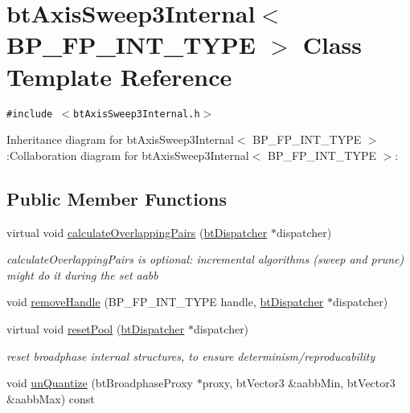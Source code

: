 \hypertarget{classbt_axis_sweep3_internal}{
\section{btAxisSweep3Internal$<$ BP\_\-FP\_\-INT\_\-TYPE $>$ Class Template Reference}
\label{classbt_axis_sweep3_internal}
}
{\tt \#include $<$btAxisSweep3Internal.h$>$}

Inheritance diagram for btAxisSweep3Internal$<$ BP\_\-FP\_\-INT\_\-TYPE $>$:Collaboration diagram for btAxisSweep3Internal$<$ BP\_\-FP\_\-INT\_\-TYPE $>$:\subsection*{Public Member Functions}
\begin{CompactItemize}
\item 
\hypertarget{classbt_axis_sweep3_internal_b89835d4ecb51e2dadc7e3b6e7c29adb}{
virtual void \hyperlink{classbt_axis_sweep3_internal_b89835d4ecb51e2dadc7e3b6e7c29adb}{calculateOverlappingPairs} (\hyperlink{classbt_dispatcher}{btDispatcher} $\ast$dispatcher)}
\label{classbt_axis_sweep3_internal_b89835d4ecb51e2dadc7e3b6e7c29adb}

\begin{CompactList}\small\item\em calculateOverlappingPairs is optional: incremental algorithms (sweep and prune) might do it during the set aabb \item\end{CompactList}\item 
void \hyperlink{classbt_axis_sweep3_internal_4e26f4f8acf63f26451f6396223001bb}{removeHandle} (BP\_\-FP\_\-INT\_\-TYPE handle, \hyperlink{classbt_dispatcher}{btDispatcher} $\ast$dispatcher)
\item 
\hypertarget{classbt_axis_sweep3_internal_eecfcc066ca77ec8b9bf2c8d422716ee}{
virtual void \hyperlink{classbt_axis_sweep3_internal_eecfcc066ca77ec8b9bf2c8d422716ee}{resetPool} (\hyperlink{classbt_dispatcher}{btDispatcher} $\ast$dispatcher)}
\label{classbt_axis_sweep3_internal_eecfcc066ca77ec8b9bf2c8d422716ee}

\begin{CompactList}\small\item\em reset broadphase internal structures, to ensure determinism/reproducability \item\end{CompactList}\item 
\hypertarget{classbt_axis_sweep3_internal_72c4adb519fe1be273fa767828952e79}{
void \hyperlink{classbt_axis_sweep3_internal_72c4adb519fe1be273fa767828952e79}{unQuantize} (btBroadphaseProxy $\ast$proxy, btVector3 \&aabbMin, btVector3 \&aabbMax) const }
\label{classbt_axis_sweep3_internal_72c4adb519fe1be273fa767828952e79}


\end{CompactItemize}
